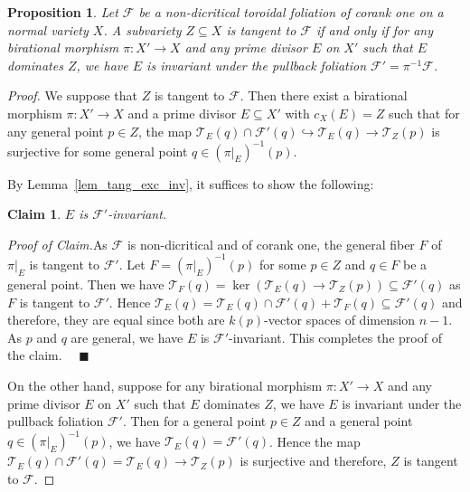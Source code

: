 \documentclass[12pt,reqno]{amsart}
\newtheorem*{claim}{Claim}
\newtheorem{proposition}[theorem]{Proposition}
\theoremstyle{definition}
\newenvironment{claimproof}[1]{\par\noindent\emph{Proof of Claim.}\space#1}{}
\newcommand\cF{{\mathcal{F}}}
\newcommand\cT{{\mathcal{T}}}
\begin{document}
\begin{proposition}\label{tang_CS}
    Let $\cF$ be a non-dicritical toroidal foliation of corank one on a normal variety $X$. 
    A subvariety $Z\subseteq X$ is tangent to $\cF$ if and only if for any birational morphism $\pi\colon X'\to X$ and any prime divisor $E$ on $X'$ such that $E$ dominates $Z$, we have $E$ is invariant under the pullback foliation $\cF'=\pi^{-1}\cF$. 
\end{proposition}
\begin{proof}
    We suppose that $Z$ is tangent to $\cF$. 
    Then there exist a birational morphism $\pi\colon X'\to X$ and a prime divisor $E\subseteq X'$ with $c_X(E)=Z$ such that for any general point $p\in Z$, the map $\cT_E(q)\cap\cF'(q)\hookrightarrow\cT_E(q) \to \cT_Z(p)$ is surjective for some general point $q\in(\pi\vert_E)^{-1}(p)$. 
    
    By Lemma~\ref{lem_tang_exc_inv}, it suffices to show the following: 
    \begin{claim}
        $E$ is $\cF'$-invariant. 
    \end{claim}
    \begin{claimproof}
        As $\cF$ is non-dicritical and of corank one, the general fiber $F$ of $\pi\vert_E$ is tangent to $\cF'$. 
        Let $F=(\pi\vert_E)^{-1}(p)$ for some $p\in Z$ and $q\in F$ be a general point. 
        Then we have $\cT_F(q) = \ker(\cT_E(q)\to\cT_Z(p))\subseteq\cF'(q)$ as $F$ is tangent to $\cF'$. 
        Hence $\cT_E(q) = \cT_E(q)\cap\cF'(q) + \cT_F(q)\subseteq\cF'(q)$ and therefore, they are equal since both are $k(p)$-vector spaces of dimension $n-1$.  
        As $p$ and $q$ are general, we have $E$ is $\cF'$-invariant. 
        This completes the proof of the claim. $\quad\blacksquare$
    \end{claimproof}

    On the other hand, suppose for any birational morphism $\pi\colon X'\to X$ and any prime divisor $E$ on $X'$ such that $E$ dominates $Z$, we have $E$ is invariant under the pullback foliation $\cF'$. 
    Then for a general point $p\in Z$ and a general point $q\in (\pi\vert_E)^{-1}(p)$, we have $\cT_E(q) = \cF'(q)$. 
    Hence the map $\cT_E(q)\cap\cF'(q) = \cT_E(q) \to \cT_Z(p)$ is surjective and therefore, $Z$ is tangent to $\cF$. 
\end{proof}
\end{document}
